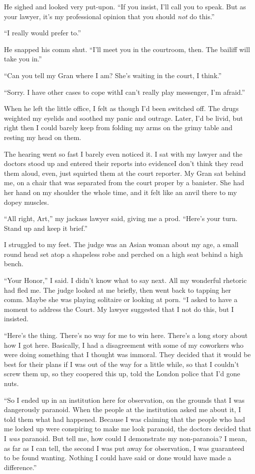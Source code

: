 He sighed and looked very put-upon. “If you insist, I’ll call you
to speak. But as your lawyer, it’s my professional opinion that you
should \emph{not} do this.”

“I really would prefer to.”

He snapped his comm shut. “I’ll meet you in the courtroom, then.
The bailiff will take you in.”

“Can you tell my Gran where I am? She’s waiting in the court, I
think.”

“Sorry. I have other cases to cope with{\dash}I can’t really play
messenger, I’m afraid.”

When he left the little office, I felt as though I’d been switched
off. The drugs weighted my eyelids and soothed my panic and
outrage. Later, I’d be livid, but right then I could barely keep
from folding my arms on the grimy table and resting my head on
them.

The hearing went so fast I barely even noticed it. I sat with my
lawyer and the doctors stood up and entered their reports into
evidence{\dash}I don’t think they read them aloud, even, just squirted
them at the court reporter. My Gran sat behind me, on a chair that
was separated from the court proper by a banister. She had her hand
on my shoulder the whole time, and it felt like an anvil there to
my dopey muscles.

“All right, Art,” my jackass lawyer said, giving me a prod. “Here’s
your turn. Stand up and keep it brief.”

I struggled to my feet. The judge was an Asian woman about my age,
a small round head set atop a shapeless robe and perched on a high
seat behind a high bench.

“Your Honor,” I said. I didn’t know what to say next. All my
wonderful rhetoric had fled me. The judge looked at me briefly,
then went back to tapping her comm. Maybe she was playing solitaire
or looking at porn. “I asked to have a moment to address the Court.
My lawyer suggested that I not do this, but I insisted.

“Here’s the thing. There’s no way for me to win here. There’s a
long story about how I got here. Basically, I had a disagreement
with some of my coworkers who were doing something that I thought
was immoral. They decided that it would be best for their plans if
I was out of the way for a little while, so that I couldn’t screw
them up, so they coopered this up, told the London police that I’d
gone nuts.

“So I ended up in an institution here for observation, on the
grounds that I was dangerously paranoid. When the people at the
institution asked me about it, I told them what had happened.
Because I was claiming that the people who had me locked up were
conspiring to make me look paranoid, the doctors decided that I
\emph{was} paranoid. But tell me, how could I demonstrate my
non-paranoia? I mean, as far as I can tell, the second I was put
away for observation, I was guaranteed to be found wanting. Nothing
I could have said or done would have made a difference.”

